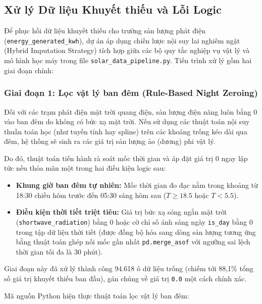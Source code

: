 \documentclass[12pt, a4paper]{report}
\begin{document}
\subsection{Xử lý Dữ liệu Khuyết thiếu và Lỗi Logic}
\label{subsec:null_imputation}

Để phục hồi dữ liệu khuyết thiếu cho trường sản lượng phát điện (\texttt{energy\_generated\_kwh}), dự án áp dụng chiến lược nội suy lai nghiêm ngặt (Hybrid Imputation Strategy) tích hợp giữa các bộ quy tắc nghiệp vụ vật lý và mô hình học máy trong file \texttt{solar\_data\_pipeline.py}. Tiến trình xử lý gồm hai giai đoạn chính:

\subsubsection{Giai đoạn 1: Lọc vật lý ban đêm (Rule-Based Night Zeroing)}
Đối với các trạm phát điện mặt trời quang điện, sản lượng điện năng luôn bằng 0 vào ban đêm do không có bức xạ mặt trời. Nếu sử dụng các thuật toán nội suy thuần toán học (như tuyến tính hay spline) trên các khoảng trống kéo dài qua đêm, hệ thống sẽ sinh ra các giá trị sản lượng ảo (dương) phi vật lý. 

Do đó, thuật toán tiến hành rà soát mốc thời gian và áp đặt giá trị 0 ngay lập tức nếu thỏa mãn một trong hai điều kiện logic sau:
\begin{itemize}
    \item \textbf{Khung giờ ban đêm tự nhiên:} Mốc thời gian đo đạc nằm trong khoảng từ 18:30 chiều hôm trước đến 05:30 sáng hôm sau ($T \ge 18.5$ hoặc $T < 5.5$).
    \item \textbf{Điều kiện thời tiết triệt tiêu:} Giá trị bức xạ sóng ngắn mặt trời (\texttt{shortwave\_radiation}) bằng 0 hoặc cờ chỉ số ánh sáng ngày \texttt{is\_day} bằng 0 trong tập dữ liệu thời tiết (được đồng bộ hóa sang dòng sản lượng tương ứng bằng thuật toán ghép nối mốc gần nhất \texttt{pd.merge\_asof} với ngưỡng sai lệch thời gian tối đa là 30 phút).
\end{itemize}
Giai đoạn này đã xử lý thành công 94.618 ô dữ liệu trống (chiếm tới 88,1\% tổng số giá trị khuyết thiếu ban đầu), gán chúng về giá trị \texttt{0.0} một cách chính xác.

Mã nguồn Python hiện thực thuật toán lọc vật lý ban đêm:
\end{document}
